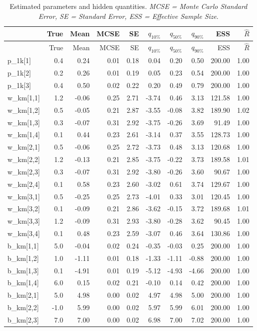 \documentclass[]{article}
\begin{document}
\begin{longtable}[]{@{}lrrrrrrrrr@{}}
\caption{Estimated parameters and hidden quantities. \emph{MCSE = Monte
Carlo Standard Error, SE = Standard Error, ESS = Effective Sample
Size}.}\tabularnewline
\toprule
& True & Mean & MCSE & SE & \(q_{10\%}\) & \(q_{50\%}\) & \(q_{90\%}\) &
ESS & \(\hat{R}\)\tabularnewline
\midrule
\endfirsthead
\toprule
& True & Mean & MCSE & SE & \(q_{10\%}\) & \(q_{50\%}\) & \(q_{90\%}\) &
ESS & \(\hat{R}\)\tabularnewline
\midrule
\endhead
p\_1k{[}1{]} & 0.4 & 0.24 & 0.01 & 0.18 & 0.04 & 0.20 & 0.50 & 200.00 &
1.00\tabularnewline
p\_1k{[}2{]} & 0.2 & 0.26 & 0.01 & 0.19 & 0.05 & 0.23 & 0.54 & 200.00 &
1.00\tabularnewline
p\_1k{[}3{]} & 0.4 & 0.50 & 0.02 & 0.22 & 0.20 & 0.49 & 0.79 & 200.00 &
1.00\tabularnewline
w\_km{[}1,1{]} & 1.2 & -0.06 & 0.25 & 2.71 & -3.74 & 0.46 & 3.13 &
121.58 & 1.00\tabularnewline
w\_km{[}1,2{]} & 0.5 & -0.05 & 0.21 & 2.87 & -3.55 & -0.08 & 3.82 &
189.90 & 1.02\tabularnewline
w\_km{[}1,3{]} & 0.3 & -0.07 & 0.31 & 2.92 & -3.75 & -0.26 & 3.69 &
91.49 & 1.00\tabularnewline
w\_km{[}1,4{]} & 0.1 & 0.44 & 0.23 & 2.61 & -3.14 & 0.37 & 3.55 & 128.73
& 1.00\tabularnewline
w\_km{[}2,1{]} & 0.5 & -0.06 & 0.25 & 2.72 & -3.73 & 0.48 & 3.13 &
120.68 & 1.00\tabularnewline
w\_km{[}2,2{]} & 1.2 & -0.13 & 0.21 & 2.85 & -3.75 & -0.22 & 3.73 &
189.58 & 1.01\tabularnewline
w\_km{[}2,3{]} & 0.3 & -0.07 & 0.31 & 2.92 & -3.80 & -0.26 & 3.60 &
90.67 & 1.00\tabularnewline
w\_km{[}2,4{]} & 0.1 & 0.58 & 0.23 & 2.60 & -3.02 & 0.61 & 3.74 & 129.67
& 1.00\tabularnewline
w\_km{[}3,1{]} & 0.5 & -0.25 & 0.25 & 2.73 & -4.01 & 0.33 & 3.01 &
120.45 & 1.00\tabularnewline
w\_km{[}3,2{]} & 0.1 & -0.09 & 0.21 & 2.86 & -3.62 & -0.15 & 3.72 &
189.68 & 1.01\tabularnewline
w\_km{[}3,3{]} & 1.2 & -0.09 & 0.31 & 2.93 & -3.80 & -0.28 & 3.62 &
90.45 & 1.00\tabularnewline
w\_km{[}3,4{]} & 0.1 & 0.48 & 0.23 & 2.59 & -3.07 & 0.46 & 3.64 & 130.86
& 1.00\tabularnewline
b\_km{[}1,1{]} & 5.0 & -0.04 & 0.02 & 0.24 & -0.35 & -0.03 & 0.25 &
200.00 & 1.00\tabularnewline
b\_km{[}1,2{]} & 1.0 & -1.11 & 0.01 & 0.18 & -1.33 & -1.11 & -0.88 &
200.00 & 1.00\tabularnewline
b\_km{[}1,3{]} & 0.1 & -4.91 & 0.01 & 0.19 & -5.12 & -4.93 & -4.66 &
200.00 & 1.00\tabularnewline
b\_km{[}1,4{]} & 6.0 & 0.15 & 0.02 & 0.21 & -0.10 & 0.14 & 0.42 & 200.00
& 1.00\tabularnewline
b\_km{[}2,1{]} & 5.0 & 4.98 & 0.00 & 0.02 & 4.97 & 4.98 & 5.00 & 200.00
& 1.00\tabularnewline
b\_km{[}2,2{]} & -1.0 & 5.99 & 0.00 & 0.02 & 5.97 & 5.99 & 6.01 & 200.00
& 1.00\tabularnewline
b\_km{[}2,3{]} & 7.0 & 7.00 & 0.00 & 0.02 & 6.98 & 7.00 & 7.02 & 200.00
& 1.00\tabularnewline

\end{longtable}
\end{document}
